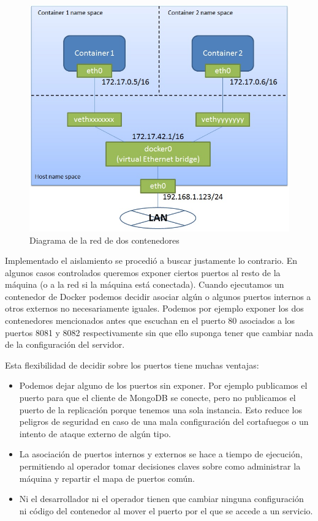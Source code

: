 \begin{figure}[H]
    \centering
    \includegraphics[width=\textwidth]{../images/docker/network.jpg}
    \caption{Diagrama de la red de dos contenedores \protect\cite{kaitoyamada2015}}
    \label{fig:docker-network}
\end{figure}

Implementado el aislamiento se procedió a buscar justamente lo contrario. En algunos casos controlados queremos exponer ciertos puertos al resto de la máquina (o a la red si la máquina está conectada). Cuando ejecutamos un contenedor de Docker podemos decidir asociar algún o algunos puertos internos a otros externos no necesariamente iguales. Podemos por ejemplo exponer los dos contenedores mencionados antes que escuchan en el puerto 80 asociados a los puertos 8081 y 8082 respectivamente sin que ello suponga tener que cambiar nada de la configuración del servidor.

\newpage

Esta flexibilidad de decidir sobre los puertos tiene muchas ventajas:
\begin{itemize}
    \item Podemos dejar alguno de los puertos sin exponer. Por ejemplo publicamos el puerto para que el cliente de MongoDB se conecte, pero no publicamos el puerto de la replicación porque tenemos una sola instancia. Esto reduce los peligros de seguridad en caso de una mala configuración del cortafuegos o un intento de ataque externo de algún tipo.
    \item La asociación de puertos internos y externos se hace a tiempo de ejecución, permitiendo al operador tomar decisiones claves sobre como administrar la máquina y repartir el mapa de puertos común.
    \item Ni el desarrollador ni el operador tienen que cambiar ninguna configuración ni código del contenedor al mover el puerto por el que se accede a un servicio.
\end{itemize}

